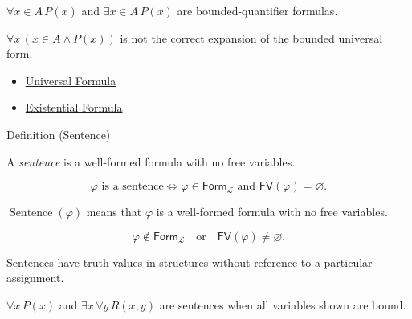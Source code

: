 \begin{remark*}[Examples]
\(\forall x\in A\,P(x)\) and \(\exists x\in A\,P(x)\) are bounded-quantifier
formulas.
\end{remark*}

\begin{remark*}
\(\forall x\,(x\in A\land P(x))\) is not the correct expansion of the bounded
universal form.
\end{remark*}

\begin{dependencies}
\begin{itemize}
  \item \hyperref[def:universal-q]{Universal Formula}
  \item \hyperref[def:existential-q]{Existential Formula}
\end{itemize}
\end{dependencies}

\begin{definitionbox}{Definition (Sentence)}
\begin{definition}[Sentence]
\label{def:sentence-predicate-logic}
A \emph{sentence} is a well-formed formula with no free variables.
\end{definition}
\end{definitionbox}

\begin{remark*}
\[
\varphi \text{ is a sentence}
\Longleftrightarrow
\varphi\in\mathsf{Form}_{\mathcal L}
\text{ and }
\mathsf{FV}(\varphi)=\varnothing.
\]
\end{remark*}

\begin{remark*}
\(\operatorname{Sentence}(\varphi)\) means that \(\varphi\) is a well-formed
formula with no free variables.
\end{remark*}

\begin{remark*}
\[
\varphi\notin\mathsf{Form}_{\mathcal L}
\quad\text{or}\quad
\mathsf{FV}(\varphi)\neq\varnothing.
\]
\end{remark*}

\begin{remark*}[Interpretation]
Sentences have truth values in structures without reference to a particular
assignment.
\end{remark*}

\begin{remark*}[Examples]
\(\forall x\,P(x)\) and \(\exists x\,\forall y\,R(x,y)\) are sentences when all
variables shown are bound.
\end{remark*}

